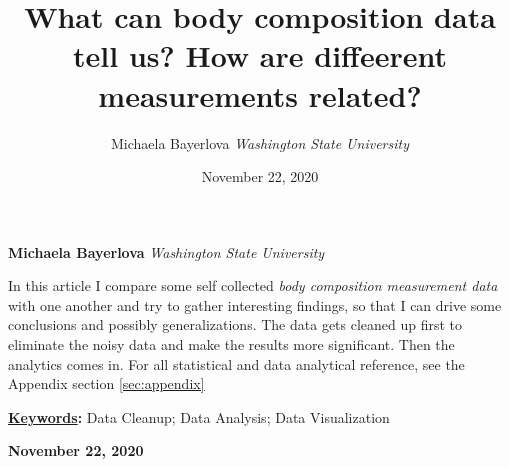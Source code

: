 \documentclass[]{article}
\title{\textbf{\textcolor{WSU.crimson}{What can body composition data
tell us?}} \newline \textbf{\textcolor{WSU.gray}{How are diffeerent
measurements related?}}  }
\author{\Large Michaela
Bayerlova\vspace{0.05in} \newline\normalsize\emph{Washington State
University}  }
\date{November 22, 2020}
\newcommand*{\authorfont}{\fontfamily{phv}\selectfont}
\renewenvironment{abstract}
 {{%
    \setlength{\leftmargin}{0mm}
    \setlength{\rightmargin}{\leftmargin}%
  }%
  \relax}
 {\endlist}
\begin{document}
	
%    


{%
\setlength{\parindent}{0pt}
\thispagestyle{plain}
{\fontsize{18}{20}\selectfont\raggedright 
\maketitle  %

}

{
   \vskip 13.5pt\relax \normalsize\fontsize{11}{12} 
   
\textbf{\authorfont Michaela
Bayerlova} \hskip 15pt \emph{\small Washington State University}   

}

}








\begin{abstract}

    \hbox{\vrule height .2pt width 39.14pc}

    \vskip 8.5pt %

\noindent In this article I compare some self collected
\emph{body composition measurement data} with one another and try to
gather interesting findings, so that I can drive some conclusions and
possibly generalizations. The data gets cleaned up first to eliminate
the noisy data and make the results more significant. Then the analytics
comes in. For all statistical and data analytical reference, see the
Appendix section \ref{sec:appendix} \vspace{0.25in}


\vskip 8.5pt \noindent \textbf{\underline{Keywords}:} Data Cleanup; Data
Analysis; Data Visualization \par

    




    
    \hbox{\vrule height .2pt width 39.14pc}
    \vskip 5pt 
    \hfill \textbf{\textcolor{WSU.gray}{ November 22, 2020 } }
    \vskip 5pt 
    
\end{abstract}


\vskip -8.5pt
\end{document}
